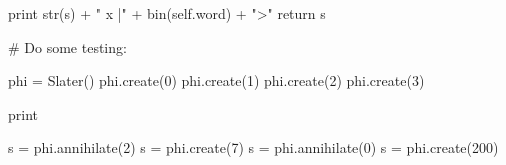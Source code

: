\documentclass[%
twoside,                 %
final,                   %
10pt]{article}
\begin{document}
        print str(s) + " x |" + bin(self.word) + ">"
        return s



# Do some testing:

phi = Slater()
phi.create(0)
phi.create(1)
phi.create(2)
phi.create(3)

print


s = phi.annihilate(2)
s = phi.create(7)
s = phi.annihilate(0)
s = phi.create(200)

\epycod

    























\printindex
\end{document}
